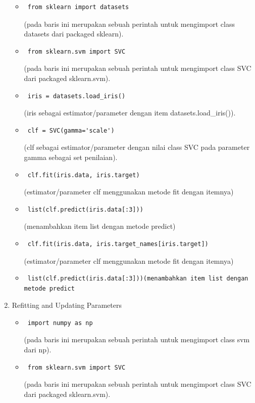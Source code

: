 \begin{enumerate}
\begin{itemize}
\item\begin{verbatim} from sklearn import datasets\end{verbatim}(pada baris ini merupakan sebuah perintah untuk mengimport class datasets dari packaged sklearn).
\item\begin{verbatim} from sklearn.svm import SVC\end{verbatim}(pada baris ini merupakan sebuah perintah untuk mengimport class SVC dari packaged sklearn.svm).
\item\begin{verbatim} iris = datasets.load_iris()\end{verbatim}(iris sebagai estimator/parameter dengan item datasets.load\_iris()).
\item\begin{verbatim} clf = SVC(gamma='scale')\end{verbatim}(clf sebagai estimator/parameter dengan nilai class SVC pada parameter gamma sebagai set penilaian).
\item\begin{verbatim} clf.fit(iris.data, iris.target)\end{verbatim}(estimator/parameter clf menggunakan metode fit dengan itemnya) 
\item\begin{verbatim} list(clf.predict(iris.data[:3]))\end{verbatim}(menambahkan item list dengan metode predict) 
\item\begin{verbatim} clf.fit(iris.data, iris.target_names[iris.target])\end{verbatim}(estimator/parameter clf menggunakan metode fit dengan itemnya)
\item\begin{verbatim} list(clf.predict(iris.data[:3]))(menambahkan item list dengan metode predict\end{verbatim} 
\end{itemize}
\item Refitting and Updating Parameters
\begin{itemize}
\item\begin{verbatim} import numpy as np\end{verbatim}(pada baris ini merupakan sebuah perintah untuk mengimport class svm dari np).
\item\begin{verbatim} from sklearn.svm import SVC\end{verbatim}(pada baris ini merupakan sebuah perintah untuk mengimport class SVC dari packaged sklearn.svm).

\end{itemize}
\end{enumerate}
